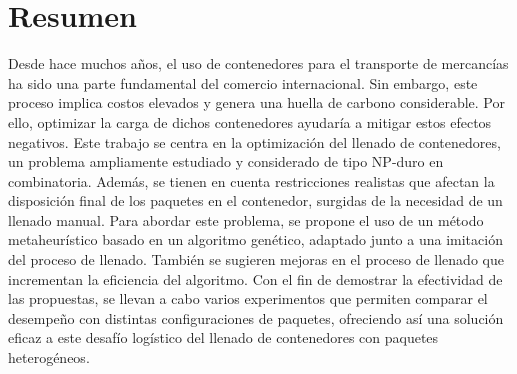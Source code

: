 \documentclass[openany]{article}
\begin{document}
\vspace{2cm}

\section*{Resumen}

Desde hace muchos años, el uso de contenedores para el transporte de mercancías ha sido una parte fundamental del comercio internacional. Sin embargo, este proceso implica costos elevados y genera una huella de carbono considerable. Por ello, optimizar la carga de dichos contenedores ayudaría a mitigar estos efectos negativos. Este trabajo se centra en la optimización del llenado de contenedores, un problema ampliamente estudiado y considerado de tipo NP-duro en combinatoria. Además, se tienen en cuenta restricciones realistas que afectan la disposición final de los paquetes en el contenedor, surgidas de la necesidad de un llenado manual. Para abordar este problema, se propone el uso de un método metaheurístico basado en un algoritmo genético, adaptado junto a una imitación del proceso de llenado. También se sugieren mejoras en el proceso de llenado que incrementan la eficiencia del algoritmo. Con el fin de demostrar la efectividad de las propuestas, se llevan a cabo varios experimentos que permiten comparar el desempeño con distintas configuraciones de paquetes, ofreciendo así una solución eficaz a este desafío logístico del llenado de contenedores con paquetes heterogéneos.

%









\newpage
\thispagestyle{plain}
{
    \tableofcontents
}
\end{document}
